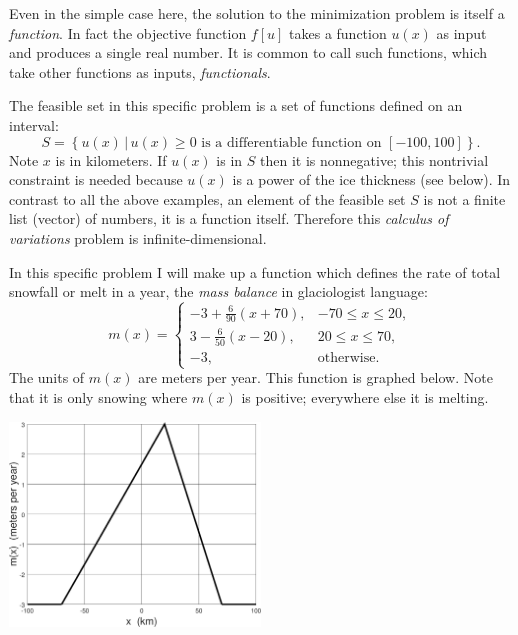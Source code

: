 \documentclass[11pt]{amsart}
\begin{document}
\begin{enumerate}
Even in the simple case here, the solution to the minimization problem is itself a \emph{function}.  In fact the objective function $f[u]$ takes a function $u(x)$ as input and produces a single real number.  It is common to call such functions, which take other functions as inputs, \emph{functionals}.

The feasible set in this specific problem is a set of functions defined on an interval:
    $$S = \left\{u(x) \,\big|\, u(x) \ge 0 \text{ is a differentiable function on } [-100,100]\right\}.$$
Note $x$ is in kilometers.  If $u(x)$ is in $S$ then it is nonnegative; this nontrivial constraint is needed because $u(x)$ is a power of the ice thickness (see below).  In contrast to all the above examples, an element of the feasible set $S$ is not a finite list (vector) of numbers, it is a function itself.  Therefore this \emph{calculus of variations} problem is infinite-dimensional.

In this specific problem I will make up a function which defines the rate of total snowfall or melt in a year, the \emph{mass balance} in glaciologist language:
    $$m(x) = \begin{cases} -3 + \frac{6}{90} (x+70), & -70 \le x \le 20, \\
                            3 - \frac{6}{50} (x-20), & 20 \le x \le 70, \\
                           -3, & \text{otherwise}.
             \end{cases}$$
The units of $m(x)$ are meters per year.  This function is graphed below.  Note that it is only snowing where $m(x)$ is positive; everywhere else it is melting.

\bigskip
\begin{center}
\includegraphics[width=0.5\textwidth]{massbalance}  %
\end{center}



\end{enumerate}
\end{document}
